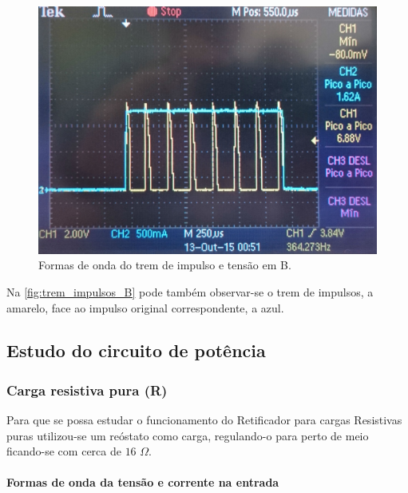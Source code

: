 \documentclass[a4paper,11pt]{article}
\numberwithin{equation}{section}
\begin{document}
\begin{figure}[h]
	\centering
	\includegraphics[keepaspectratio=true, scale=0.09]{img/figs/trem_impulsos_B}
	\caption{Formas de onda do trem de impulso e tensão em B.}
	\label{fig:trem_impulsos_B}
	\vspace{-0.8em}
\end{figure}

Na \autoref{fig:trem_impulsos_B} pode também observar-se o trem de impulsos, a amarelo, face ao impulso original correspondente, a azul.


\subsection{Estudo do circuito de potência}

\subsubsection{Carga resistiva pura (R)}

Para que se possa estudar o funcionamento do Retificador para cargas Resistivas puras utilizou-se um reóstato como carga, regulando-o para perto de meio ficando-se com cerca de $16$ $\Omega$.

\paragraph{Formas de onda da tensão e corrente na entrada}
\end{document}
